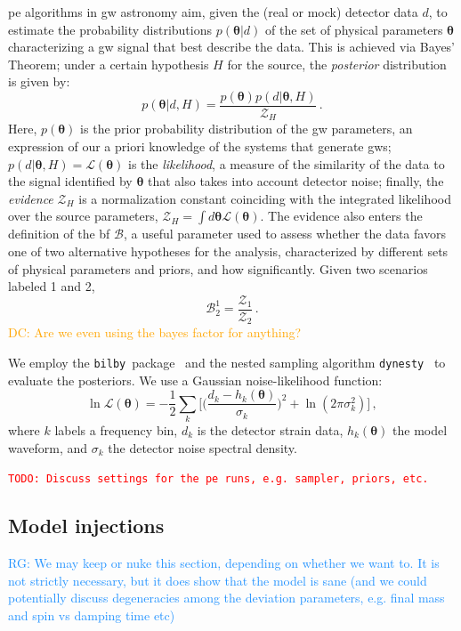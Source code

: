 \documentclass[prd,amssymb,amsmath,amsfonts,nofootinbib,reprint,showpacs,longbibliography]{revtex4-1}
\newcommand{\RG}[1]{{\textcolor{dodgerblue}{{RG: #1}} }}
\newcommand{\DC}[1]{{\textcolor{orange}{{DC: #1}} }}
\newcommand{\todo}[1]{\textcolor{red}{\texttt{TODO: #1}}}
\newcommand{\bilby}[0]{\texttt{bilby}}
\begin{document}
\ac{pe} algorithms in \ac{gw} astronomy aim, given the (real or mock) detector data $d$, to estimate the
probability distributions $p (\bm{\theta} | d)$ of the set of physical parameters $\bm{\theta}$ characterizing
a \ac{gw} signal that best describe the data. This is achieved via Bayes' Theorem; under a certain hypothesis $H$
for the source, the \textit{posterior} distribution is given by:
\begin{equation}
    p (\bm{\theta}|d, H) = \dfrac{p(\bm{\theta}) p (d | \bm{\theta}, H)}{\mathcal{Z}_H}\, .
\end{equation}
Here, $p(\bm{\theta})$ is the prior probability distribution of the \ac{gw} parameters, an expression of our
a priori knowledge of the systems that generate \acp{gw}; $p(d | \bm{\theta}, H) = \mathcal{L} (\bm{\theta})$ is
the \textit{likelihood}, a measure of the similarity of the data to the signal identified by $\bm{\theta}$ that also
takes into account detector noise; finally, the \textit{evidence} $\mathcal{Z}_H$ is a normalization constant coinciding
with the integrated likelihood over the source parameters, $\mathcal{Z}_H = \int d \bm{\theta} \mathcal{L} (\bm \theta)$.
The evidence also enters the definition of the \ac{bf} $\mathcal{B}$, a useful parameter used to assess whether the data
favors one of two alternative hypotheses for the analysis, characterized by different sets of physical parameters and
priors, and how significantly. Given two scenarios labeled 1 and 2,
\begin{equation}
    \mathcal{B}^1_2 = \dfrac{\mathcal{Z}_1}{\mathcal{Z}_2}\, .
\end{equation}
\DC{Are we even using the bayes factor for anything?}

We employ the \bilby~package~\cite{Ashton:2018jfp} and the nested sampling algorithm \texttt{dynesty}~\cite{Speagle:2020}
to evaluate the posteriors. We use a Gaussian noise-likelihood function:
\begin{equation}
    \ln \mathcal{L} (\bm{\theta}) = -\dfrac{1}{2} \sum_k \biggl[ \biggl( \dfrac{d_k - h_k(\bm{\theta})}{\sigma_k} \biggr)^2 + \ln (2 \pi \sigma_k^2)\biggr]\, ,
\end{equation}
where $k$ labels a frequency bin, $d_k$ is the detector strain data, $h_k (\bm{\theta})$ the model waveform, 
and $\sigma_k$ the detector noise spectral density.

\todo{Discuss settings for the \ac{pe} runs, e.g. sampler, priors, etc.}

\subsection{Model injections}
\RG{We may keep or nuke this section, depending on whether we want to. It is not strictly necessary,
but it does show that the model is sane (and we could potentially discuss degeneracies among the deviation parameters,
e.g. final mass and spin vs damping time etc)}
\end{document}
